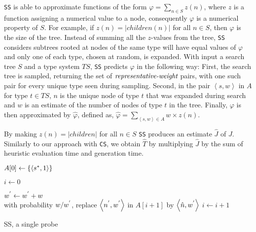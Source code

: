 \texttt{SS} is able to approximate functions of the form $\varphi = \sum_{n \in S}z(n)$, where $z$ is a function assigning a numerical value to a node, consequently $\varphi$ is a numerical property of $S$. For example, if $z(n)=|children(n)|$ for all $n \in S$, then $\varphi$ is the size of the tree. Instead of summing all the $z$-values from the tree, \texttt{SS} considers  subtrees rooted at nodes of the same type will have equal values of $\varphi$ and only one of each type, chosen at random, is expanded. With input a search tree $S$ and a type system $TS$, \texttt{SS} predicts $\varphi$ in the following way: First, the search tree is sampled, returning the set of $\emph{representative-weight}$ pairs, with one such pair for every unique type seen during sampling. Second, in the pair $\left\langle s,w \right\rangle$ in $A$ for type $t \in TS$, $n$ is the unique node of type $t$ that was expanded during search and $w$ is an estimate of the number of nodes of type $t$ in the tree. Finally, $\varphi$ is then approximated by $\hat{\varphi}$, defined as, $\hat{\varphi} =  \sum_{\left\langle s,w \right\rangle \in A}w \times z(n)$.

By making $z(n) = |children|$ for all $n \in S$ \texttt{SS} produces an estimate $\hat{J}$ of $J$. Similarly to our approach with \texttt{CS}, we obtain $\hat{T}$ by multiplying $\hat{J}$ by the sum of heuristic evaluation time and generation time.

\begin{algorithm}

$A[0] \leftarrow \{\left\langle  s\sp{*},1 \right\rangle \}$

$i \leftarrow 0$

 {
	 {
		 {
			 {
				 {
				$w\sp{'} \leftarrow w\sp{'} + w$\\ 
				with probability $w/w\sp{'}$, replace $\left\langle n\sp{'}, w\sp{'} \right\rangle$ in $A[i+1]$ by $\left\langle \hat{n},w\sp{'} \right\rangle$
				} 
			}
		}
	}
	$i \leftarrow i + 1$
}
\caption{SS, a single probe}
\label{alg:ss_algorithm}
\end{algorithm}

